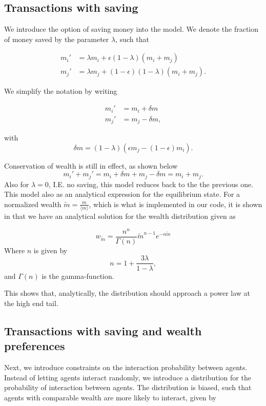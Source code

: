 \documentclass{emulateapj}
\begin{document}
\subsection{Transactions with saving}
We introduce the option of saving money into the model. We denote the fraction of money saved by the parameter $\lambda$, such that 

\begin{align}
m_i'&=\lambda m_i+\epsilon(1-\lambda)(m_i+m_j) \\
m_j'&=\lambda m_j+(1-\epsilon)(1-\lambda)(m_i+m_j).
\end{align}

We simplify the notation by writing 

\begin{align}
    m_i' &= m_i + \delta m \\
    m_j' &= m_j - \delta m,
\end{align}

with
\begin{equation}
    \delta m = \left(1-\lambda \right)\left(\epsilon m_j - \left(1-\epsilon\right)m_i\right).
\end{equation}

Conservation of wealth is still in effect, as shown below
\begin{equation}
    m_i'+m_j'= m_i + \delta m + m_j - \delta m = m_i + m_j.
\end{equation}
Also for $\lambda = 0$, I.E. no saving, this model reduces back to the the previous one. This model also as an analytical expression for the equilibrium state. For a normalized wealth $\tilde{m} = \frac{m}{\langle m \rangle}$, which is what is implemented in our code, it is shown in \cite{paper1} that we have an analytical solution for the wealth distribution given as 

\begin{equation}
w_{\tilde{m}}=\frac{n^n}{\Gamma(n)}\tilde{m}^{n-1}e^{-n\tilde{m}}
\end{equation}
Where $n$ is given by
\begin{equation}
    n=1+\frac{3\lambda}{1-\lambda},
\end{equation}
and $\Gamma(n)$ is the gamma-function.

This shows that, analytically, the distribution should approach a power law at the high end tail.

\subsection{Transactions with saving and wealth preferences}
Next, we introduce constraints on the interaction probability between agents. Instead of letting agents interact randomly, we introduce a distribution for the probability of interaction between agents. The distribution is biased, such that agents with comparable wealth are more likely to interact, given by
\end{document}
